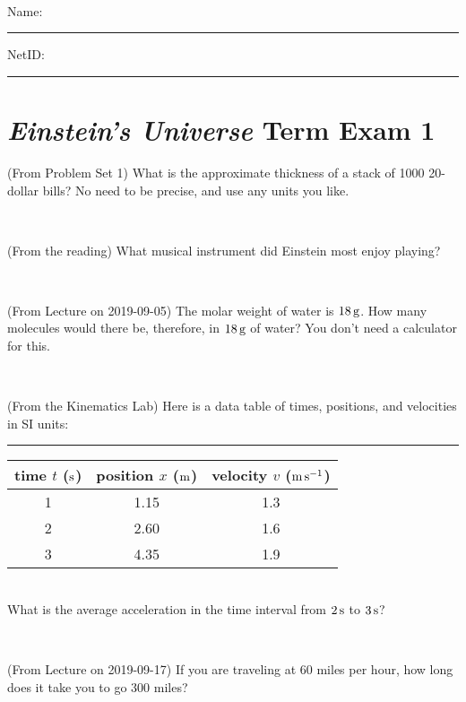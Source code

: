 \documentclass[12pt, letterpaper]{article}
\begin{document}
\vfill ~


\cleardoublepage



\noindent
Name: \rule[-1ex]{0.60\textwidth}{0.1pt}
NetID: \rule[-1ex]{0.20\textwidth}{0.1pt}

\section*{\textsl{Einstein's Universe} Term Exam 1}
\setcounter{problem}{1}


\begin{problem} (From Problem Set 1)
What is the approximate thickness of a stack of 1000 20-dollar bills?
No need to be precise, and use any units you like.
\end{problem}


\vfill ~

\begin{problem} (From the reading)
What musical instrument did Einstein most enjoy playing?
\end{problem}


\vfill ~

\begin{problem} (From Lecture on 2019-09-05)
The molar weight of water is $18\,\mathrm{g}$. How many molecules would there
be, therefore, in $18\,\mathrm{g}$ of water? You don't need a calculator for
this.
\end{problem}


\vfill ~

\begin{problem} (From the Kinematics Lab)
Here is a data table of times, positions, and velocities in SI units:\\
\rule{1.0in}{0pt}\begin{tabular}{c|c|c}
time $t$ ($\mathrm{s}$) & position $x$ ($\mathrm{m}$) & velocity $v$ ($\mathrm{m}\,\mathrm{s}^{-1}$) \\
\hline
1 & 1.15 & 1.3 \\
2 & 2.60 & 1.6 \\
3 & 4.35 & 1.9 \\
\hline
\end{tabular}\\
What is the average acceleration in the time interval from $2\,\mathrm{s}$ to $3\,\mathrm{s}$?
\end{problem}


\vfill ~


\clearpage


\begin{problem} (From Lecture on 2019-09-17)
If you are traveling at 60 miles per hour, how long does
it take you to go 300 miles?
\end{problem}
\end{document}
